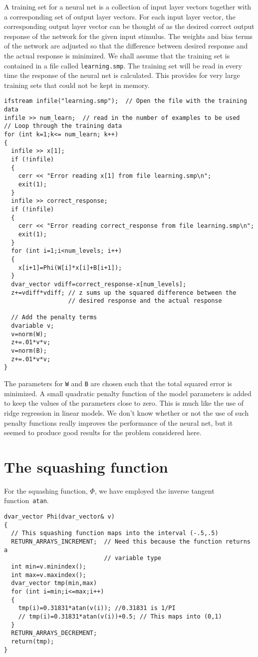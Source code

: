 \documentclass{admbmanual}
\begin{document}
A training set for a neural net is a collection of input layer vectors
together with a corresponding set of output layer vectors.
For each input layer vector, the corresponding output layer
vector can be thought of as the desired correct output response of the 
network for the given input stimulus. The weights and bias terms of the
network are adjusted so that the difference between desired response 
and the actual response is minimized.
We shall assume that the training set is contained in a file
called \texttt{learning.smp}. The training set will be read in every time the
response of the neural net is calculated. This provides
for very large training sets that could not be kept in memory.
\begin{lstlisting}
ifstream infile("learning.smp");  // Open the file with the training data
infile >> num_learn;  // read in the number of examples to be used
// Loop through the training data 
for (int k=1;k<= num_learn; k++)
{
  infile >> x[1];
  if (!infile)
  {
    cerr << "Error reading x[1] from file learning.smp\n";
    exit(1);
  }
  infile >> correct_response;
  if (!infile)
  {
    cerr << "Error reading correct_response from file learning.smp\n";
    exit(1);
  }
  for (int i=1;i<num_levels; i++)
  {
    x[i+1]=Phi(W[i]*x[i]+B[i+1]);
  }
  dvar_vector vdiff=correct_response-x[num_levels];
  z+=vdiff*vdiff; // z sums up the squared difference between the
                  // desired response and the actual response

  // Add the penalty terms
  dvariable v;
  v=norm(W);
  z+=.01*v*v;
  v=norm(B);
  z+=.01*v*v;
}
\end{lstlisting}

The parameters for \texttt{W} and \texttt{B} are chosen such that the
total squared error is minimized. A small quadratic penalty
function of the model parameters is added to keep the values of
the parameters close to zero. This is much like the use of ridge regression
\cite{hoerlkennard1970}
in linear models.  We don't know whether or not the use of such penalty
functions really improves the performance of the neural 
net, but it seemed to produce good results for the
 problem considered here.


\section{The squashing function}

For the squashing function, $\Phi$, we have employed the inverse tangent 
function~\texttt{atan}.
\begin{lstlisting} 
dvar_vector Phi(dvar_vector& v)
{
  // This squashing function maps into the interval (-.5,.5)
  RETURN_ARRAYS_INCREMENT;  // Need this because the function returns a 
                            // variable type
  int min=v.minindex();
  int max=v.maxindex();
  dvar_vector tmp(min,max)
  for (int i=min;i<=max;i++)
  {
    tmp(i)=0.31831*atan(v(i)); //0.31831 is 1/PI 
    // tmp(i)=0.31831*atan(v(i))+0.5; // This maps into (0,1) 
  }
  RETURN_ARRAYS_DECREMENT; 
  return(tmp);
}
\end{lstlisting}
\end{document}
